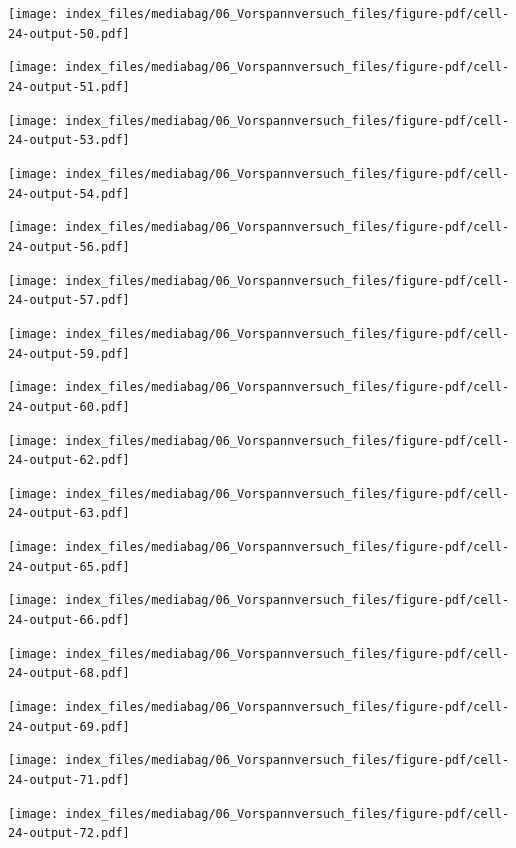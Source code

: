 \documentclass[
  11pt,
  letterpaper,
]{scrreprt}
\begin{document}
\newpage{}

\texttt{[image: index\_files/mediabag/06\_Vorspannversuch\_files/figure-pdf/cell-24-output-50.pdf]}

\texttt{[image: index\_files/mediabag/06\_Vorspannversuch\_files/figure-pdf/cell-24-output-51.pdf]}

\newpage{}

\texttt{[image: index\_files/mediabag/06\_Vorspannversuch\_files/figure-pdf/cell-24-output-53.pdf]}

\texttt{[image: index\_files/mediabag/06\_Vorspannversuch\_files/figure-pdf/cell-24-output-54.pdf]}

\newpage{}

\texttt{[image: index\_files/mediabag/06\_Vorspannversuch\_files/figure-pdf/cell-24-output-56.pdf]}

\texttt{[image: index\_files/mediabag/06\_Vorspannversuch\_files/figure-pdf/cell-24-output-57.pdf]}

\newpage{}

\texttt{[image: index\_files/mediabag/06\_Vorspannversuch\_files/figure-pdf/cell-24-output-59.pdf]}

\texttt{[image: index\_files/mediabag/06\_Vorspannversuch\_files/figure-pdf/cell-24-output-60.pdf]}

\newpage{}

\texttt{[image: index\_files/mediabag/06\_Vorspannversuch\_files/figure-pdf/cell-24-output-62.pdf]}

\texttt{[image: index\_files/mediabag/06\_Vorspannversuch\_files/figure-pdf/cell-24-output-63.pdf]}

\newpage{}

\texttt{[image: index\_files/mediabag/06\_Vorspannversuch\_files/figure-pdf/cell-24-output-65.pdf]}

\texttt{[image: index\_files/mediabag/06\_Vorspannversuch\_files/figure-pdf/cell-24-output-66.pdf]}

\newpage{}

\texttt{[image: index\_files/mediabag/06\_Vorspannversuch\_files/figure-pdf/cell-24-output-68.pdf]}

\texttt{[image: index\_files/mediabag/06\_Vorspannversuch\_files/figure-pdf/cell-24-output-69.pdf]}

\newpage{}

\texttt{[image: index\_files/mediabag/06\_Vorspannversuch\_files/figure-pdf/cell-24-output-71.pdf]}

\texttt{[image: index\_files/mediabag/06\_Vorspannversuch\_files/figure-pdf/cell-24-output-72.pdf]}
\end{document}
